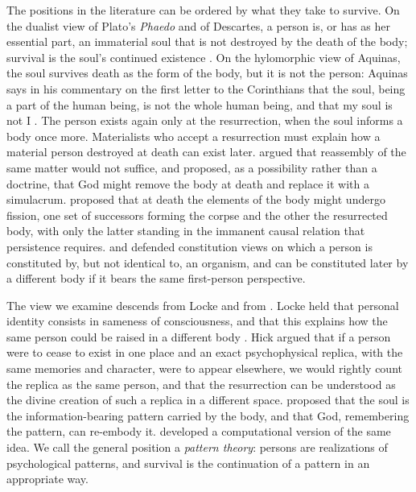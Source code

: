 \documentclass{situationist-preprint}
\begin{document}
The positions in the literature can be ordered by what they take to survive. On the dualist view of Plato's \emph{Phaedo} and of Descartes, a person is, or has as her essential part, an immaterial soul that is not destroyed by the death of the body; survival is the soul's continued existence \citep{Swinburne1997}. On the hylomorphic view of Aquinas, the soul survives death as the form of the body, but it is not the person: Aquinas says in his commentary on the first letter to the Corinthians that the soul, being a part of the human being, is not the whole human being, and that my soul is not I \citep[15, lect.~2]{AquinasCor}. The person exists again only at the resurrection, when the soul informs a body once more. Materialists who accept a resurrection must explain how a material person destroyed at death can exist later. \citet{vanInwagen1978} argued that reassembly of the same matter would not suffice, and proposed, as a possibility rather than a doctrine, that God might remove the body at death and replace it with a simulacrum. \citet{Zimmerman1999} proposed that at death the elements of the body might undergo fission, one set of successors forming the corpse and the other the resurrected body, with only the latter standing in the immanent causal relation that persistence requires. \citet{Baker2000} and \citet{Corcoran2006} defended constitution views on which a person is constituted by, but not identical to, an organism, and can be constituted later by a different body if it bears the same first-person perspective.

The view we examine descends from Locke and from \citet{Hick1976}. Locke held that personal identity consists in sameness of consciousness, and that this explains how the same person could be raised in a different body \citep[II.xxvii]{Locke1694}. Hick argued that if a person were to cease to exist in one place and an exact psychophysical replica, with the same memories and character, were to appear elsewhere, we would rightly count the replica as the same person, and that the resurrection can be understood as the divine creation of such a replica in a different space. \citet[ch.~6]{Polkinghorne2002} proposed that the soul is the information-bearing pattern carried by the body, and that God, remembering the pattern, can re-embody it. \citet{Steinhart2014} developed a computational version of the same idea. We call the general position a \emph{pattern theory}: persons are realizations of psychological patterns, and survival is the continuation of a pattern in an appropriate way.
\end{document}
